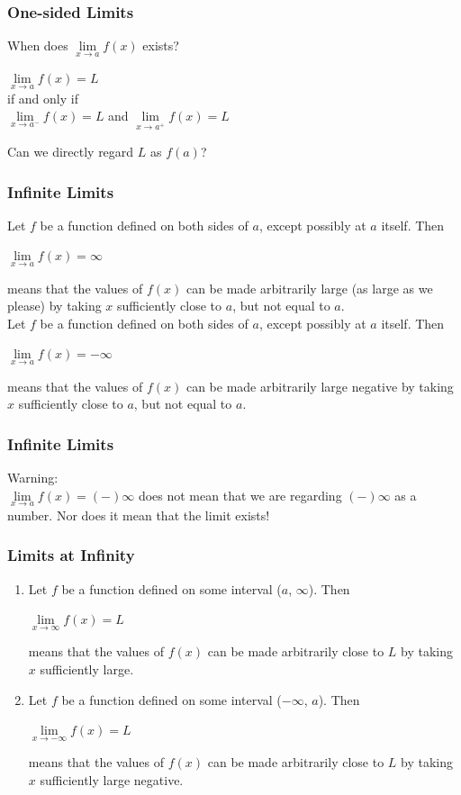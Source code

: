 	\begin{frame}
		\frametitle{One-sided Limits}
		When does $\lim\limits_{\textit{x} \to a}f(x)$ exists?\\
		\bigskip
		\begin{center}
			$\lim\limits_{\textit{x} \to a}f(x) = L$\\
			\bigskip
			\alert{if and only if}\\
			\bigskip
			$\lim\limits_{\textit{x} \to a^{-}}f(x) = L$ and $\lim\limits_{\textit{x} \to a^{+}}f(x) = L$
		\end{center}
		Can we directly regard $L$ as $f(a)$?
	\end{frame}
	\begin{frame}

		\frametitle{Infinite Limits}
		Let $f$ be a function defined on both sides of $a$, \alert{except possibly} at $a$ itself. Then
		\begin{center}
			$\lim\limits_{\textit{x} \to a}f(x) = \infty$
		\end{center}
		means that the values of $f(x)$ can be made arbitrarily large (as large as we please) by taking $x$ \alert{sufficiently close to} $a$, but \alert{not equal to} $a$.\\

		Let $f$ be a function defined on both sides of $a$, \alert{except possibly} at $a$ itself. Then
		\begin{center}
			$\lim\limits_{\textit{x} \to a}f(x) = -\infty$
		\end{center}
		means that the values of $f(x)$ can be made arbitrarily large negative by taking $x$ \alert{sufficiently close to} $a$, but \alert{not equal to} $a$.
	\end{frame}
	\begin{frame}
		\frametitle{Infinite Limits}
		\alert{Warning:}\\
		$\lim\limits_{\textit{x} \to a}f(x) = (-)\infty$ does not mean that we are regarding $(-)\infty$ as a number. Nor does it mean that the limit exists!
	\end{frame}
	\begin{frame}
		\frametitle{Limits at Infinity}
		\begin{enumerate}
			\item Let $f$ be a function defined on some interval ($a$, $\infty$). Then
			\begin{center}
				$\lim\limits_{\textit{x} \to \infty}f(x) = L$
			\end{center}
			means that the values of $f(x)$ can be made arbitrarily close to $L$ by taking $x$ sufficiently large.
		\item Let $f$ be a function defined on some interval ($-\infty$, $a$). Then
			\begin{center}
				$\lim\limits_{\textit{x} \to -\infty}f(x) = L$
			\end{center}
			means that the values of $f(x)$ can be made arbitrarily close to $L$ by taking $x$ sufficiently large negative.
		\end{enumerate}
	\end{frame}
